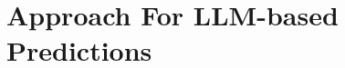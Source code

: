 \documentclass[manuscript,screen,review]{acmart}
\newcommand{\ME}{\mathcal{E}}
\newcommand{\MT}{\mathcal{T}}
\newcommand{\ML}{\mathcal{L}}
\newcommand{\NN}{\mathbb{N}}
\begin{document}







\section{Approach For LLM-based Predictions}\label{sec:framework}
\end{document}
